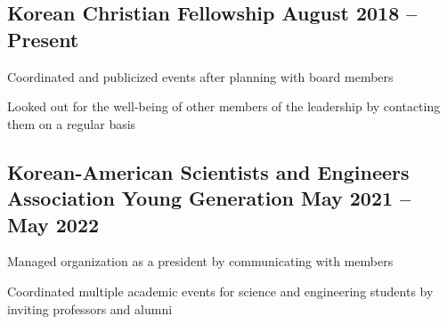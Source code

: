 \documentclass[letter,10pt]{article}
\begin{document}


\subsection{{Korean Christian Fellowship \hfill August 2018 – Present}}

\begin{zitemize}
\item Coordinated and publicized events after planning with board members
\item Looked out for the well-being of other members of the leadership by contacting them on a regular basis

\end{zitemize}

\subsection{{Korean-American Scientists and Engineers Association Young Generation  \hfill May 2021 – May 2022}}
\begin{zitemize}

\item Managed organization as a president by communicating with members 
\item Coordinated multiple academic events for science and engineering students by inviting professors and alumni

\end{zitemize}
\end{document}
